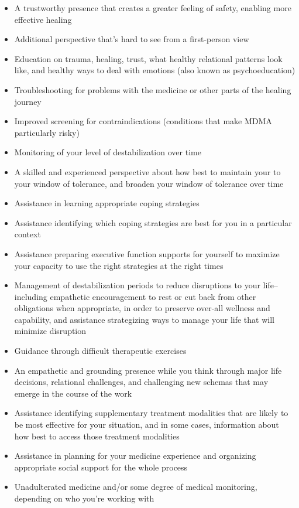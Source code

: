 \documentclass[12pt,letterpaper]{book}
\begin{document}
\begin{itemize}
    \item A trustworthy presence that creates a greater feeling of safety, enabling more effective healing
    \item Additional perspective that's hard to see from a first-person view
    \item Education on trauma, healing, trust, what healthy relational patterns look like, and healthy ways to deal with emotions (also known as psychoeducation)
    \item Troubleshooting for problems with the medicine or other parts of the healing journey
    \item Improved screening for contraindications (conditions that make MDMA particularly risky)
    \item Monitoring of your level of destabilization over time
    \item A skilled and experienced perspective about how best to maintain your to your window of tolerance, and broaden your window of tolerance over time
    \item Assistance in learning appropriate coping strategies
    \item Assistance identifying which coping strategies are best for you in a particular context
    \item Assistance preparing executive function supports for yourself to maximize your capacity to use the right strategies at the right times
    \item Management of destabilization periods to reduce disruptions to your life–including empathetic encouragement to rest or cut back from other obligations when appropriate, in order to preserve over-all wellness and capability, and assistance strategizing ways to manage your life that will minimize disruption 
    \item Guidance through difficult therapeutic exercises 
    \item An empathetic and grounding presence while you think through major life decisions, relational challenges, and challenging new schemas that may emerge in the course of the work
    \item Assistance identifying supplementary treatment modalities that are likely to be most effective for your situation, and in some cases, information about how best to access those treatment modalities
    \item Assistance in planning for your medicine experience and organizing appropriate social support for the whole process
    \item Unadulterated medicine and/or some degree of medical monitoring, depending on who you're working with
\end{itemize}
\end{document}
